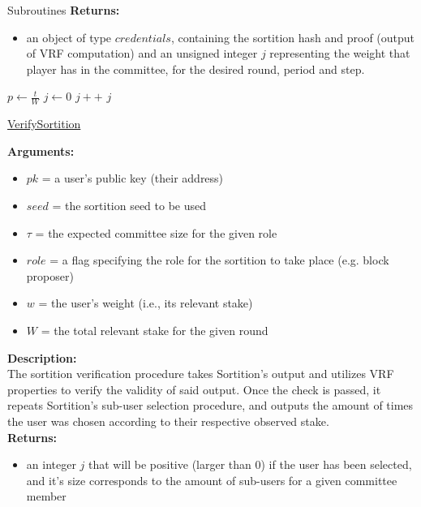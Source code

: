 \documentclass[10pt,a4paper]{article}
\begin{document}
\begin{section}{Subroutines}
\noindent \textbf{Returns:}
\begin{itemize}
    \item an object of type $credentials$, containing the sortition hash and proof (output of VRF
    computation) and an unsigned integer $j$ representing the weight that player has in the committee,
    for the desired round, period and step.
  \end{itemize}



\begin{algorithm}[H]
    \begin{algorithmic}[1]
        \State $p \gets \frac{t}{W}$
        \State $j \gets 0$
        \While{$\frac{hash}{2^{hashlen}} \notin [\sum_{k=0}^j\mathsf{B}(k;w,p), \sum_{k=0}^{j+1}\mathsf{B}(k;w,p))$}
            \State $j++$
        \EndWhile
        \Return $j$
    \EndFunction
    \end{algorithmic}
    \caption{\underline{VerifySortition}}
\end{algorithm}

\noindent \textbf{Arguments:}
\begin{itemize}
    \item $pk$ = a user's public key (their address)
    \item $seed$ = the sortition seed to be used
    \item $\tau$ = the expected committee size for the given role
    \item $role$ = a flag specifying the role for the sortition to take place (e.g. block proposer)
    \item $w$ = the user's weight (i.e., its relevant stake)
    \item $W$ = the total relevant stake for the given round
  \end{itemize}

\noindent \textbf{Description:}\\
The sortition verification procedure takes Sortition's output and utilizes 
VRF properties to verify the validity of said output.
Once the check is passed, it repeats Sortition's sub-user selection procedure, 
and outputs the amount of times the user was chosen according to their respective 
observed stake.\\

\noindent \textbf{Returns:}
\begin{itemize}
    \item an integer $j$ that will be positive (larger than 0) if the user has been 
    selected, and it's size corresponds to the amount
    of sub-users for a given committee member
  \end{itemize}


\end{section}
\end{document}
